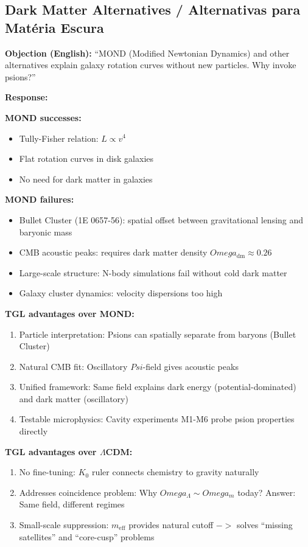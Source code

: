 \documentclass[12pt,a4paper]{article}
\def\Psi{Psi}%
\def\to{ -> }%
\def\Omega{Omega}%
\begin{document}
\subsection{Dark Matter Alternatives / Alternativas para Matéria Escura}

\textbf{Objection (English):} ``MOND (Modified Newtonian Dynamics) and other alternatives explain galaxy rotation curves without new particles. Why invoke psions?''

\textbf{Response:} 

\textbf{MOND successes:}
\begin{itemize}
    \item Tully-Fisher relation: $L \propto v^4$
    \item Flat rotation curves in disk galaxies
    \item No need for dark matter in galaxies
\end{itemize}

\textbf{MOND failures:}
\begin{itemize}
    \item Bullet Cluster (1E 0657-56): spatial offset between gravitational lensing and baryonic mass
    \item CMB acoustic peaks: requires dark matter density $\Omega_{\text{dm}} \approx 0.26$
    \item Large-scale structure: N-body simulations fail without cold dark matter
    \item Galaxy cluster dynamics: velocity dispersions too high
\end{itemize}

\textbf{TGL advantages over MOND:}
\begin{enumerate}
    \item Particle interpretation: Psions can spatially separate from baryons (Bullet Cluster)
    \item Natural CMB fit: Oscillatory $\Psi$-field gives acoustic peaks
    \item Unified framework: Same field explains dark energy (potential-dominated) and dark matter (oscillatory)
    \item Testable microphysics: Cavity experiments M1-M6 probe psion properties directly
\end{enumerate}

\textbf{TGL advantages over $\Lambda$CDM:}
\begin{enumerate}
    \item No fine-tuning: $K_0$ ruler connects chemistry to gravity naturally
    \item Addresses coincidence problem: Why $\Omega_\Lambda \sim \Omega_m$ today? Answer: Same field, different regimes
    \item Small-scale suppression: $m_{\text{eff}}$ provides natural cutoff $\to$ solves ``missing satellites'' and ``core-cusp'' problems
\end{enumerate}
\end{document}
